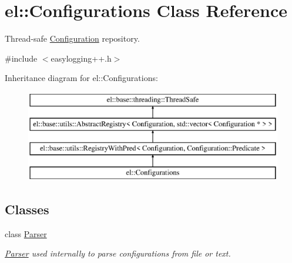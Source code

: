 \hypertarget{classel_1_1_configurations}{}\section{el\+:\+:Configurations Class Reference}
\label{classel_1_1_configurations}


Thread-\/safe \hyperlink{classel_1_1_configuration}{Configuration} repository.  




{\ttfamily \#include $<$easylogging++.\+h$>$}

Inheritance diagram for el\+:\+:Configurations\+:\begin{figure}[H]
\begin{center}
\leavevmode
\includegraphics[height=4.000000cm]{classel_1_1_configurations}
\end{center}
\end{figure}
\subsection*{Classes}
\begin{DoxyCompactItemize}
\item 
class \hyperlink{classel_1_1_configurations_1_1_parser}{Parser}
\begin{DoxyCompactList}\small\item\em \hyperlink{classel_1_1_configurations_1_1_parser}{Parser} used internally to parse configurations from file or text. \end{DoxyCompactList}\end{DoxyCompactItemize}
